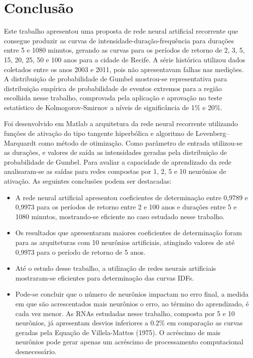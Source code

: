 \chapter{Conclusão}

Este trabalho apresentou uma proposta de rede neural artificial recorrente que consegue produzir as curvas de intensidade-duração-frequência para durações entre 5 e 1080 minutos, gerando as curvas para os períodos de retorno de 2, 3, 5, 15, 20, 25, 50 e 100 anos para a cidade de Recife. A série histórica utilizou dados coletados entre os anos 2003 e 2011, pois não apresentavam falhas nas medições. A distribuição de probabilidade de Gumbel mostrou-se representativa para distribuição empírica de probabilidade de eventos extremos para a região escolhida nesse trabalho, comprovada pela aplicação e aprovação no teste estatístico de Kolmogorov-Smirnov a níveis de significância de 1\% e 20\%.

Foi desenvolvido em Matlab a arquitetura da rede neural recorrente utilizando funções de ativação do tipo tangente hiperbólica e algoritmo de Levenberg–Marquardt como método de otimização. Como parâmetro de entrada utilizou-se as durações, e valores de saída as intensidades geradas pela distribuição de probabilidade de Gumbel. Para avaliar a capacidade de aprendizado da rede analisaram-se as saídas para redes compostas por 1, 2, 5 e 10 neurônios de ativação. As seguintes conclusões podem ser destacadas:

\begin{itemize}
    \item A rede neural artificial apresentou coeficientes de determinação entre 0,9789 e 0,9973 para os períodos de retorno entre 2 e 100 anos e durações entre 5 e 1080 minutos, mostrando-se eficiente no caso estudado nesse trabalho.
    \item Os resultados que apresentaram maiores coeficientes de determinação foram para as arquiteturas com 10 neurônios artificiais, atingindo valores de até 0,9973 para o período de retorno de 5 anos.
    \item Até o estudo desse trabalho, a utilização de redes neurais artificiais mostraram-se eficientes para determinação das curvas IDFs.
    \item Pode-se concluir que o número de neurônios impactam no erro final, a medida em que são acrescentados mais neurônios o erro, ao término do aprendizado, é cada vez menor. As RNAs estudadas nesse trabalho, composta por 5 e 10 neurônios, já apresentam desvios inferiores a 0.2\% em comparação as curvas geradas pela Equação de Villela-Mattos (1975). O acréscimo de mais neurônios pode gerar apenas um acréscimo de processamento computacional desnecessário.
\end{itemize}

